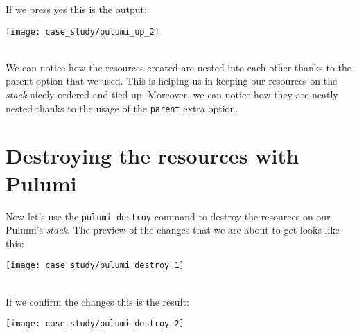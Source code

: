 If we press yes this is the output:
\begin{center}
  \texttt{[image: case\_study/pulumi\_up\_2]} 
\end{center}\mbox{}\\
We can notice how the resources created are nested into each other thanks to the parent option that we used.
This is helping us in keeping our resources on the \textit{stack} nicely ordered and tied up.
Moreover, we can notice how they are neatly nested thanks to the usage of the \texttt{parent} extra option.\\

\section{Destroying the resources with Pulumi}
Now let's use the \texttt{pulumi destroy} command to destroy the resources on our Pulumi's \textit{stack}.
The preview of the changes that we are about to get looks like this:
\begin{center}
  \texttt{[image: case\_study/pulumi\_destroy\_1]} 
\end{center}\mbox{}\\

If we confirm the changes this is the result:
\begin{center}
  \texttt{[image: case\_study/pulumi\_destroy\_2]} 
\end{center}\mbox{}\\


